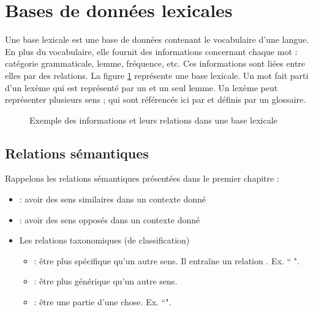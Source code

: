 \documentclass{KodeBook}
\begin{document}
\section{Bases de données lexicales}

Une base lexicale est une base de données contenant le vocabulaire d'une langue. 
En plus du vocabulaire, elle fournit des informations concernant chaque mot : catégorie grammaticale, lemme, fréquence, etc.
Ces informations sont liées entre elles par des relations. 
La figure \ref{fig:base-lex-exp} représente une base lexicale.
Un mot fait parti d'un lexème qui est représenté par un et un seul lemme. 
Un lexème peut représenter plusieurs sens ; qui sont référencés ici par  et définis par un glossaire.
 
\begin{figure}[ht]
	\centering 
	\caption[Exemple des informations et leurs relations dans une base lexicale]{Exemple des informations et leurs relations dans une base lexicale \cite{2019-white-al}}
	\label{fig:base-lex-exp}
\end{figure}

\subsection{Relations sémantiques}

Rappelons les relations sémantiques présentées dans le premier chapitre :
\begin{itemize}
	\item {} : avoir des sens similaires dans un contexte donné
	\item {} : avoir des sens opposés dans un contexte donné
	\item Les relations taxonomiques (de classification)
	\begin{itemize}
		\item {} : être plus spécifique qu'un autre sens. Il entraîne un relation . Ex. `` ".
		\item {} : être plus générique qu'un autre sens. 
		\item {} : être une partie d'une chose. Ex. ``".
	\end{itemize}
\end{itemize}
\end{document}
